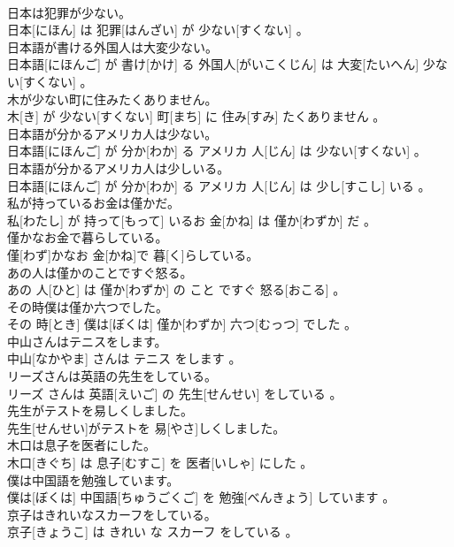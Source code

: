 \documentclass[8pt]{extreport}
\begin{document}
\begin{CJK}{UTF8}{min}
\\	日本は犯罪が少ない。	
\\	日本[にほん] は 犯罪[はんざい] が 少ない[すくない] 。
\\	日本語が書ける外国人は大変少ない。	
\\	日本語[にほんご] が 書け[かけ] る 外国人[がいこくじん] は 大変[たいへん] 少ない[すくない] 。
\\	木が少ない町に住みたくありません。	
\\	木[き] が 少ない[すくない] 町[まち] に 住み[すみ] たくありません 。
\\	日本語が分かるアメリカ人は少ない。	
\\	日本語[にほんご] が 分か[わか] る アメリカ 人[じん] は 少ない[すくない] 。
\\	日本語が分かるアメリカ人は少しいる。	
\\	日本語[にほんご] が 分か[わか] る アメリカ 人[じん] は 少し[すこし] いる 。
\\	私が持っているお金は僅かだ。	
\\	私[わたし] が 持って[もって] いるお 金[かね] は 僅か[わずか] だ 。
\\	僅かなお金で暮らしている。	
\\	僅[わず]かなお 金[かね]で 暮[く]らしている。
\\	あの人は僅かのことですぐ怒る。	
\\	あの 人[ひと] は 僅か[わずか] の こと ですぐ 怒る[おこる] 。
\\	その時僕は僅か六つでした。	
\\	その 時[とき] 僕は[ぼくは] 僅か[わずか] 六つ[むっつ] でした 。
\\	中山さんはテニスをします。	
\\	中山[なかやま] さんは テニス をします 。
\\	リーズさんは英語の先生をしている。	
\\	リーズ さんは 英語[えいご] の 先生[せんせい] をしている 。
\\	先生がテストを易しくしました。	
\\	先生[せんせい]がテストを 易[やさ]しくしました。
\\	木口は息子を医者にした。	
\\	木口[きぐち] は 息子[むすこ] を 医者[いしゃ] にした 。
\\	僕は中国語を勉強しています。	
\\	僕は[ぼくは] 中国語[ちゅうごくご] を 勉強[べんきょう] しています 。
\\	京子はきれいなスカーフをしている。	
\\	京子[きょうこ] は きれい な スカーフ をしている 。

\end{CJK}
\end{document}
